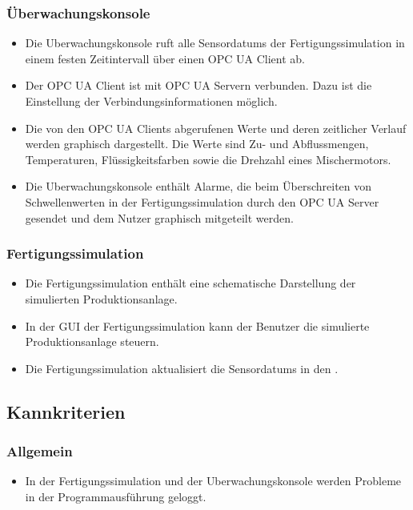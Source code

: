 \documentclass[parskip=full]{scrartcl}
\begin{document}
\subsubsection{Überwachungskonsole}
\begin{itemize}
  \item Die \gls{Uberwachungskonsole} ruft alle \glspl{Sensordatum} der \gls{Fertigungssimulation} in einem festen Zeitintervall über einen \gls{OPC UA} Client ab.
  \item Der \gls{OPC UA} Client ist mit \gls{OPC UA} Servern verbunden. Dazu ist die Einstellung der Verbindungsinformationen möglich.
  \item Die von den \glspl{OPC UA Client} abgerufenen Werte und deren zeitlicher Verlauf werden graphisch dargestellt. Die Werte sind Zu- und Abflussmengen, Temperaturen,
    Flüssigkeitsfarben sowie die Drehzahl eines Mischermotors.
  \item Die \gls{Uberwachungskonsole} enthält Alarme, die beim Überschreiten von Schwellenwerten in der \gls{Fertigungssimulation} durch den \gls{OPC UA} Server gesendet
    und dem Nutzer graphisch mitgeteilt werden.
\end{itemize}

\subsubsection{Fertigungssimulation}
\begin{itemize}
  \item Die \gls{Fertigungssimulation} enth\"alt eine schematische Darstellung der simulierten \gls{Produktionsanlage}.
  \item In der \gls{GUI} der \gls{Fertigungssimulation} kann der Benutzer die simulierte \gls{Produktionsanlage} steuern.
  \item Die \gls{Fertigungssimulation} aktualisiert die \glspl{Sensordatum} in den .
\end{itemize}

\subsection{Kannkriterien}
\subsubsection{Allgemein}
\begin{itemize}
  \item In der \gls{Fertigungssimulation} und der \gls{Uberwachungskonsole} werden Probleme in der Programmausf\"uhrung geloggt.
\end{itemize}
\end{document}
